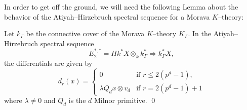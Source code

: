 In order to get off the ground, we will need the following Lemma about the behavior of the Atiyah--Hirzebruch spectral sequence for a Morava $K$--theory:
\begin{lemma}\label{MoravaKThyAHSS}
Let $k_\Gamma$ be the connective cover of the Morava $K$--theory $K_\Gamma$.  In the Atiyah--Hirzebruch spectral sequence \[E_2^{*, *} = Hk^* X \otimes_k k_\Gamma^* \Rightarrow k_\Gamma^* X,\] the differentials are given by \[d_r(x) = \begin{cases} 0 & \text{if $r \le 2(p^d - 1)$}, \\ \lambda Q_d x \otimes v_d & \text{if $r = 2(p^d - 1) + 1$} \end{cases}\] where $\lambda \ne 0$ and $Q_d$ is the $d${\th} Milnor primitive. \qed
\end{lemma}

